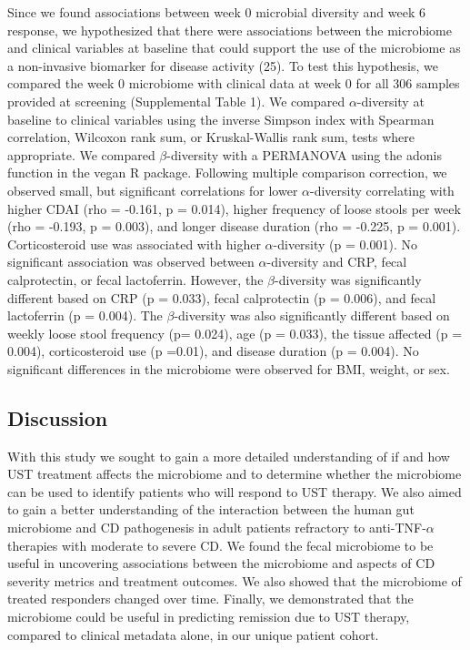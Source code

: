 \documentclass[11pt,]{article}
\begin{document}
Since we found associations between week 0 microbial diversity and week
6 response, we hypothesized that there were associations between the
microbiome and clinical variables at baseline that could support the use
of the microbiome as a non-invasive biomarker for disease activity (25).
To test this hypothesis, we compared the week 0 microbiome with clinical
data at week 0 for all 306 samples provided at screening (Supplemental
Table 1). We compared \({\alpha}\)-diversity at baseline to clinical
variables using the inverse Simpson index with Spearman correlation,
Wilcoxon rank sum, or Kruskal-Wallis rank sum, tests where appropriate.
We compared \({\beta}\)-diversity with a PERMANOVA using the adonis
function in the vegan R package. Following multiple comparison
correction, we observed small, but significant correlations for lower
\({\alpha}\)-diversity correlating with higher CDAI (rho = -0.161, p =
0.014), higher frequency of loose stools per week (rho = -0.193, p =
0.003), and longer disease duration (rho = -0.225, p = 0.001).
Corticosteroid use was associated with higher \({\alpha}\)-diversity (p
= 0.001). No significant association was observed between
\({\alpha}\)-diversity and CRP, fecal calprotectin, or fecal
lactoferrin. However, the \({\beta}\)-diversity was significantly
different based on CRP (p = 0.033), fecal calprotectin (p = 0.006), and
fecal lactoferrin (p = 0.004). The \({\beta}\)-diversity was also
significantly different based on weekly loose stool frequency (p=
0.024), age (p = 0.033), the tissue affected (p = 0.004), corticosteroid
use (p =0.01), and disease duration (p = 0.004). No significant
differences in the microbiome were observed for BMI, weight, or sex.

\subsection{Discussion}\label{discussion}

With this study we sought to gain a more detailed understanding of if
and how UST treatment affects the microbiome and to determine whether
the microbiome can be used to identify patients who will respond to UST
therapy. We also aimed to gain a better understanding of the interaction
between the human gut microbiome and CD pathogenesis in adult patients
refractory to anti-TNF-\({\alpha}\) therapies with moderate to severe
CD. We found the fecal microbiome to be useful in uncovering
associations between the microbiome and aspects of CD severity metrics
and treatment outcomes. We also showed that the microbiome of treated
responders changed over time. Finally, we demonstrated that the
microbiome could be useful in predicting remission due to UST therapy,
compared to clinical metadata alone, in our unique patient cohort.
\end{document}
